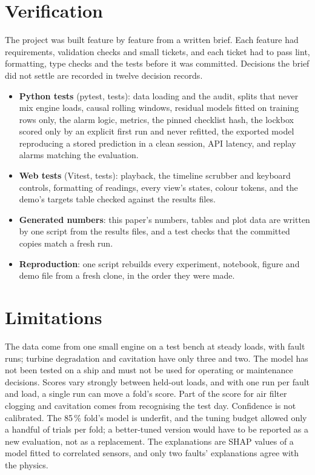 \documentclass[10pt]{article}
\begin{document}
\section{Verification}

The project was built feature by feature from a written brief. Each feature had requirements, validation checks and small tickets, and each ticket had to pass lint, formatting, type checks and the tests before it was committed. Decisions the brief did not settle are recorded in twelve decision records.

\begin{itemize}
  \item \textbf{Python tests} (pytest, \TestsPython{} tests): data loading and the audit, splits that never mix engine loads, causal rolling windows, residual models fitted on training rows only, the alarm logic, metrics, the pinned checklist hash, the lockbox scored only by an explicit first run and never refitted, the exported model reproducing a stored prediction in a clean session, API latency, and replay alarms matching the evaluation.
  \item \textbf{Web tests} (Vitest, \TestsWeb{} tests): playback, the timeline scrubber and keyboard controls, formatting of readings, every view's states, colour tokens, and the demo's targets table checked against the results files.
  \item \textbf{Generated numbers}: this paper's numbers, tables and plot data are written by one script from the results files, and a test checks that the committed copies match a fresh run.
  \item \textbf{Reproduction}: one script rebuilds every experiment, notebook, figure and demo file from a fresh clone, in the order they were made.
\end{itemize}

\section{Limitations}

The data come from one small engine on a test bench at steady loads, with \DataFaultRuns{} fault runs; turbine degradation and cavitation have only three and two. The model has not been tested on a ship and must not be used for operating or maintenance decisions. Scores vary strongly between held-out loads, and with one run per fault and load, a single run can move a fold's score. Part of the score for air filter clogging and cavitation comes from recognising the test day. Confidence is not calibrated. The 85\,\% fold's model is underfit, and the tuning budget allowed only a handful of trials per fold; a better-tuned version would have to be reported as a new evaluation, not as a replacement. The explanations are SHAP values of a model fitted to correlated sensors, and only two faults' explanations agree with the physics.
\end{document}
